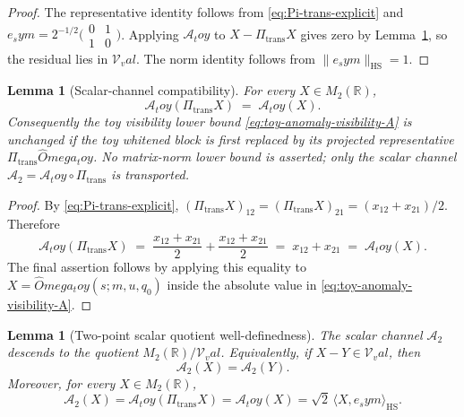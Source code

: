 \documentclass[11pt,a4paper]{amsart}
\def\Omega{Omega}%
\def\toy{toy}%
\def\val{val}%
\def\sym{sym}%
\numberwithin{equation}{section}
\theoremstyle{plain}
\newtheorem{lemma}[theorem]{Lemma}
\theoremstyle{definition}
\newcommand{\Om}{\Omega}
\newcommand{\sym}{\mathrm{sym}}
\newcommand{\toy}{\mathrm{toy}}
\newcommand{\val}{\mathrm{val}}
\newcommand{\trans}{\mathrm{trans}}
\begin{document}
\begin{proof}
The representative identity follows from
\eqref{eq:Pi-trans-explicit} and
\(e_\sym=2^{-1/2}\bigl(\begin{smallmatrix}0&1\\1&0\end{smallmatrix}\bigr)\).
Applying \(\mathcal A_\toy\) to \(X-\Pi_\trans X\) gives zero by
Lemma~\ref{lem:transverse-projection-A-toy-compatibility}, so the
residual lies in \(\mathcal V_\val\).  The norm identity follows from
\(\|e_\sym\|_{\mathrm{HS}}=1\).
\end{proof}

\begin{lemma}[Scalar-channel compatibility]
\label{lem:transverse-projection-A-toy-compatibility}
For every \(X\in M_2(\mathbb R)\),
\begin{equation}
\label{eq:A-toy-pi-compat}
        \mathcal A_\toy(\Pi_\trans X)\;=\;\mathcal A_\toy(X).
\end{equation}
Consequently the toy visibility lower bound
\eqref{eq:toy-anomaly-visibility-A} is unchanged if the toy whitened
block is first replaced by its projected representative
\(\Pi_\trans\widehat\Om_\toy\).  No matrix-norm lower bound is
asserted; only the scalar channel
\(\mathcal A_2=\mathcal A_\toy\circ\Pi_\trans\) is transported.
\end{lemma}

\begin{proof}
By \eqref{eq:Pi-trans-explicit},
\((\Pi_\trans X)_{12}=(\Pi_\trans X)_{21}=(x_{12}+x_{21})/2\).
Therefore
\[
        \mathcal A_\toy(\Pi_\trans X)
        \;=\;\frac{x_{12}+x_{21}}{2}+\frac{x_{12}+x_{21}}{2}
        \;=\;x_{12}+x_{21}
        \;=\;\mathcal A_\toy(X).
\]
The final assertion follows by applying this equality to
\(X=\widehat\Om_\toy(s;m,u,q_0)\) inside the absolute value in
\eqref{eq:toy-anomaly-visibility-A}.
\end{proof}

\begin{lemma}[Two-point scalar quotient well-definedness]
\label{lem:A2-quotient-well-defined}
The scalar channel \(\mathcal A_2\) descends to the quotient
\(M_2(\mathbb R)/\mathcal V_\val\).  Equivalently, if
\(X-Y\in\mathcal V_\val\), then
\begin{equation}
\label{eq:A2-quotient-well-defined}
        \mathcal A_2(X)=\mathcal A_2(Y).
\end{equation}
Moreover, for every \(X\in M_2(\mathbb R)\),
\begin{equation}
\label{eq:A2-representative-identities}
        \mathcal A_2(X)
        =\mathcal A_\toy(\Pi_\trans X)
        =\mathcal A_\toy(X)
        =\sqrt2\,\langle X,e_\sym\rangle_{\mathrm{HS}}.
\end{equation}
\end{lemma}
\end{document}
